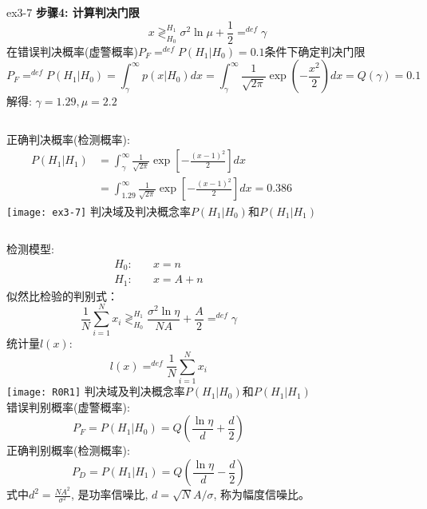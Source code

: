 \begin{frame}{ex3-7}
\textbf{步骤4: 计算判决门限}
\[x\mathop{\gtrless}_{H_0}^{H_1}\sigma^2\ln\mu+\frac{1}{2}\mathop{=}^{def}\gamma \]
在错误判决概率(虚警概率)$P_F\mathop{=}^{def}P(H_1|H_0)=0.1$条件下确定判决门限
\[ P_F\mathop{=}^{def}P(H_1|H_0)=\int_{\gamma}^{\infty}p(x|H_0)dx=\int_{\gamma}^{\infty}\frac{1}{\sqrt{2\pi}}\exp\left(-\frac{x^2}{2}\right)dx=Q(\gamma)=0.1 \]
解得: $\gamma=1.29,\mu=2.2$\\
\begin{columns}
	正确判决概率(检测概率):
	\begin{align*}
	P(H_1|H_1)&=\int_{\gamma}^{\infty}\frac{1}{\sqrt{2\pi}}\exp\left[-\frac{(x-1)^2}{2}\right]dx\\
	&=\int_{1.29}^{\infty}\frac{1}{\sqrt{2\pi}}\exp\left[-\frac{(x-1)^2}{2}\right]dx=0.386
	\end{align*}
	\texttt{[image: ex3-7]}
	\scriptsize
	判决域及判决概念率$P(H_1|H_0)$和$P(H_1|H_1)$
\end{columns}
\end{frame}

\begin{frame}[shrink]
\begin{columns}
	检测模型:
	\begin{align*}
	H_0:\quad&x=n\\
	H_1:\quad&x=A+n
	\end{align*}
	似然比检验的判别式：
	\[\frac{1}{N}\sum_{i=1}^{N}x_i\mathop{\gtrless}_{H_0}^{H_1}\frac{\sigma^2\ln\eta}{NA}+\frac{A}{2}\mathop
	{=}^{def}\gamma \]
	统计量$l(x)$:
	\[l(x)\mathop{=}^{def}\frac{1}{N}\sum_{i=1}^{N}x_i \]
	\texttt{[image: R0R1]}
	\scriptsize
	判决域及判决概念率$P(H_1|H_0)$和$P(H_1|H_1)$\\
	\normalsize
	错误判别概率(虚警概率):
	\[P_F=P(H_1|H_0)=Q\left(\frac{\ln\eta}{d}+\frac{d}{2}\right)\]
	正确判别概率(检测概率):
	\[P_D=P(H_1|H_1)=Q\left(\frac{\ln\eta}{d}-\frac{d}{2}\right)\]
	式中$d^2=\frac{NA^2}{\sigma^2}$, 是功率信噪比, $d=\sqrt{N}A/\sigma$, 称为幅度信噪比。
\end{columns}
\end{frame}

